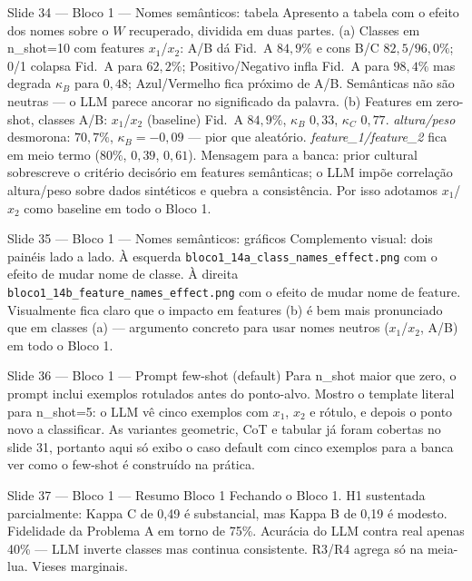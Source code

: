 \documentclass[aspectratio=169,10pt]{beamer}
\begin{document}
\begin{frame}{Slide 34 --- Bloco 1 --- Nomes sem\^anticos: tabela}
\footnotesize
Apresento a tabela com o efeito dos nomes sobre o $W$ recuperado, dividida em duas partes. (a) Classes em n\_shot=10 com features $x_1$/$x_2$: A/B d\'a Fid.\ A $84{,}9\%$ e cons B/C $82{,}5/96{,}0\%$; 0/1 colapsa Fid.\ A para $62{,}2\%$; Positivo/Negativo infla Fid.\ A para $98{,}4\%$ mas degrada $\kappa_B$ para $0{,}48$; Azul/Vermelho fica pr\'oximo de A/B. Sem\^anticas n\~ao s\~ao neutras --- o LLM parece ancorar no significado da palavra. (b) Features em zero-shot, classes A/B: $x_1$/$x_2$ (baseline) Fid.\ A $84{,}9\%$, $\kappa_B$ $0{,}33$, $\kappa_C$ $0{,}77$. \emph{altura/peso} desmorona: $70{,}7\%$, $\kappa_B = -0{,}09$ --- pior que aleat\'orio. \emph{feature\_1/feature\_2} fica em meio termo ($80\%$, $0{,}39$, $0{,}61$). Mensagem para a banca: prior cultural sobrescreve o crit\'erio decis\'orio em features sem\^anticas; o LLM imp\~oe correla\c{c}\~ao altura/peso sobre dados sint\'eticos e quebra a consist\^encia. Por isso adotamos $x_1$/$x_2$ como baseline em todo o Bloco 1.
\end{frame}

\begin{frame}{Slide 35 --- Bloco 1 --- Nomes sem\^anticos: gr\'aficos}
\footnotesize
Complemento visual: dois pain\'eis lado a lado. \`A esquerda \texttt{bloco1\_14a\_class\_names\_effect.png} com o efeito de mudar nome de classe. \`A direita \texttt{bloco1\_14b\_feature\_names\_effect.png} com o efeito de mudar nome de feature. Visualmente fica claro que o impacto em features (b) \'e bem mais pronunciado que em classes (a) --- argumento concreto para usar nomes neutros ($x_1$/$x_2$, A/B) em todo o Bloco 1.
\end{frame}

\begin{frame}{Slide 36 --- Bloco 1 --- Prompt few-shot (default)}
\footnotesize
Para n\_shot maior que zero, o prompt inclui exemplos rotulados antes do ponto-alvo. Mostro o template literal para n\_shot=5: o LLM v\^e cinco exemplos com $x_1$, $x_2$ e r\'otulo, e depois o ponto novo a classificar. As variantes geometric, CoT e tabular j\'a foram cobertas no slide 31, portanto aqui s\'o exibo o caso default com cinco exemplos para a banca ver como o few-shot \'e constru\'ido na pr\'atica.
\end{frame}

\begin{frame}{Slide 37 --- Bloco 1 --- Resumo Bloco 1}
\footnotesize
Fechando o Bloco 1. H1 sustentada parcialmente: Kappa C de 0{,}49 \'e substancial, mas Kappa B de 0{,}19 \'e modesto. Fidelidade da Problema A em torno de 75\%. Acur\'acia do LLM contra real apenas 40\% --- LLM inverte classes mas continua consistente. R3/R4 agrega s\'o na meia-lua. Vieses marginais.
\end{frame}
\end{document}
